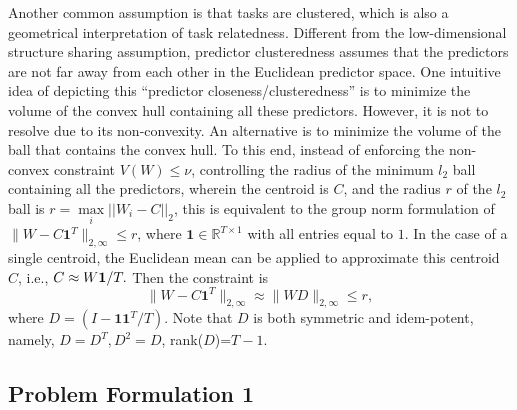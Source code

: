 \documentclass[twoside,leqno,twocolumn]{article}
\begin{document}
Another common assumption is that tasks are clustered, which is also a geometrical interpretation of task relatedness.
Different from the low-dimensional structure sharing assumption, predictor
clusteredness assumes that the predictors are not far away from each
other in the Euclidean predictor space. One intuitive idea of depicting
this ``predictor closeness/clusteredness'' is to minimize the volume
of the convex hull containing all these predictors. However, it is not
to resolve due to its non-convexity. 
An alternative is to minimize the volume of the ball that contains
the convex hull. To this end, instead of enforcing the non-convex constraint
$V(W)\leq\nu$, controlling the radius of the minimum $l_{2}$
ball containing all the predictors, wherein the centroid is $C$,
and the radius $r$ of the $l_{2}$ ball is $r = \mathop {\max }\limits_i ||{W_i} - C|{|_2}$,
this is equivalent to the group norm formulation of $\|W-C\mathbf{1}^{T}\|_{2,\infty}\leq r$,
where $\mathbf{1} \in \mathbb{R}^{T \times 1}$ with all entries
equal to $1$.  In the case of a single centroid, the Euclidean
mean can be applied to approximate this centroid $C$, i.e., 
$
C \approx W{\bf{1}}/T.
$
 Then the constraint is 
\begin{equation}
\|W-C\mathbf{1}^{T}\|_{2,\infty}\approx\|WD\|_{2,\infty}\leq r,
\end{equation}
where $D=(I-\boldsymbol{11}^{T}/T)$. Note that $D$ is both symmetric and idem-potent, namely, $D=D^{T},D^{2}=D$,
rank($D$)=$T-1$.  


\subsection{Problem Formulation 1}
\end{document}
